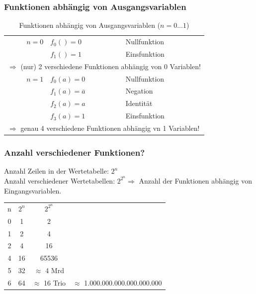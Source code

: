 \documentclass[10pt,a4paper]{scrartcl}
\begin{document}
\subsubsection{Funktionen abhängig von Ausgangsvariablen}
\begin{table}[h!]
	\centering
	\begin{tabular}{|r|l|l|}
	\hline
	$ n = 0 $ & $ f_0() = 0 $ & \glqq Nullfunktion\grqq{} \\
					 & $ f_1() = 1 $ & \glqq Einsfunktion\grqq{} \\ \hline
\multicolumn{3}{|l|}{$ \Rightarrow $ (nur) 2 verschiedene Funktionen abhängig von 0 Variablen!}\\ \hline
	$ n = 1 $ & $ f_0(a) = 0 $ & \glqq Nullfunktion\grqq{} \\
					 & $ f_1(a) = \overline{a} $ & \glqq Negation\grqq{} \\
					 & $ f_2(a) = a $ & \glqq Identität\grqq{} \\
					 & $ f_3(a) = 1 $ & \glqq Einsfunktion\grqq{} \\ \hline
 \multicolumn{3}{|l|}{$ \Rightarrow $ genau 4 verschiedene Funktionen abhängig vn 1 Variablen!}\\ \hline
\end{tabular}
\label{tab:funktionenausgang}
\caption{Funktionen abhängig von Ausgangsvariablen ($ n = 0 \ldots 1 $)}
\end{table}
\FloatBarrier

\subsubsection*{Anzahl verschiedener Funktionen?}
Anzahl Zeilen in der Wertetabelle: $ 2^n $\\
Anzahl verschiedener Wertetabellen: $ 2^{2^{n}} \Rightarrow $ Anzahl der Funktionen abhängig von Eingangsvariablen.
\\
\begin{center}
	\begin{minipage}{0.45\textwidth}
	\begin{tabular}{cccl}
		n & $ 2^n $ & $ 2^{2^{n}} $& \\ \cline{1-3}
		0 & 1 & 2 &\\
		1 & 2 & 4 &\\
		2 & 4 & 16&\\
		4 & 16 & 65536&\\
		5 & 32 & $ \approx $ 4 Mrd&\\
		6 & 64 & $ \approx $ 16 Trio & $ \approx $ 1.000.000.000.000.000.000
	\end{tabular}
\end{minipage}
\begin{minipage}{0.2\textwidth}
\end{minipage}
\end{center}
\end{document}
